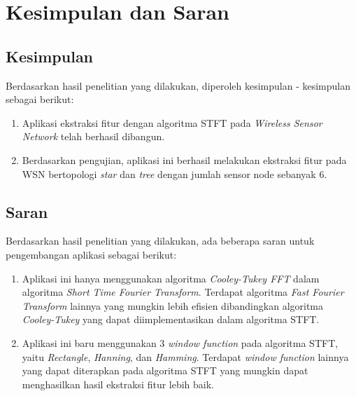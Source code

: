 \chapter{Kesimpulan dan Saran}
\label{chap:kesimpulanSaran}
\section{Kesimpulan}
Berdasarkan hasil penelitian yang dilakukan, diperoleh kesimpulan - kesimpulan sebagai berikut:
\begin{enumerate}
	\item Aplikasi ekstraksi fitur dengan algoritma STFT pada {\it Wireless Sensor Network} telah berhasil dibangun.
	\item Berdasarkan pengujian, aplikasi ini berhasil melakukan ekstraksi fitur pada WSN bertopologi {\it star} dan {\it tree} dengan jumlah sensor node sebanyak 6.
\end{enumerate}

\section{Saran}
Berdasarkan hasil penelitian yang dilakukan, ada beberapa saran untuk pengembangan aplikasi sebagai berikut:
\begin{enumerate}
	\item Aplikasi ini hanya menggunakan algoritma {\it Cooley-Tukey FFT} dalam algoritma {\it Short Time Fourier Transform}. Terdapat 
		algoritma {\it Fast Fourier Transform} lainnya yang mungkin lebih efisien dibandingkan algoritma {\it Cooley-Tukey} yang dapat 
		diimplementasikan dalam algoritma STFT.
	\item Aplikasi ini baru menggunakan 3 {\it window function} pada algoritma STFT, yaitu {\it Rectangle}, {\it Hanning}, dan {\it Hamming}. Terdapat {\it window function} lainnya yang dapat diterapkan pada algoritma STFT yang mungkin dapat menghasilkan hasil ekstraksi fitur lebih baik.
\end{enumerate}